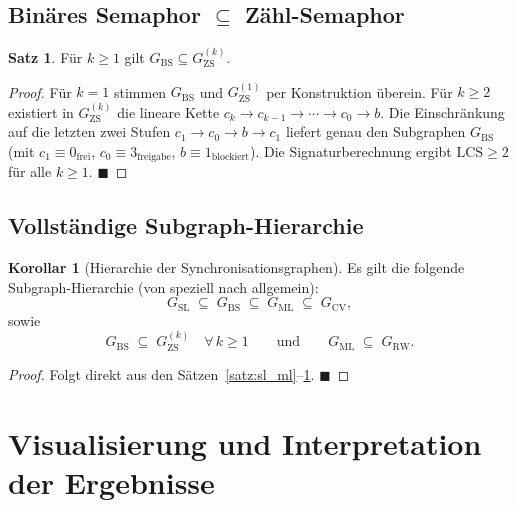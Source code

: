 ﻿\documentclass[a4paper,12pt]{article}
\theoremstyle{definition}
\newtheorem{satz}{Satz}
\newtheorem{korollar}{Korollar}
\begin{document}
\subsection{Binäres Semaphor $\subseteq$ Zähl-Semaphor}

\begin{satz}
  \label{satz:bs_zs}
  Für $k \geq 1$ gilt $G_{\mathrm{BS}} \subseteq G_{\mathrm{ZS}}^{(k)}$.
\end{satz}

\begin{proof}
  Für $k = 1$ stimmen $G_{\mathrm{BS}}$ und $G_{\mathrm{ZS}}^{(1)}$ per
  Konstruktion überein. Für $k \geq 2$ existiert in $G_{\mathrm{ZS}}^{(k)}$
  die lineare Kette $c_k \to c_{k-1} \to \cdots \to c_0 \to b$. Die
  Einschränkung auf die letzten zwei Stufen $c_1 \to c_0 \to b \to c_1$
  liefert genau den Subgraphen $G_{\mathrm{BS}}$ (mit $c_1 \equiv
  0_{\mathrm{frei}}$, $c_0 \equiv 3_{\mathrm{freigabe}}$,
  $b \equiv 1_{\mathrm{blockiert}}$).
  Die Signaturberechnung ergibt $\mathrm{LCS} \geq 2$ für alle $k \geq 1$.
  \hfill$\blacksquare$
\end{proof}

\subsection{Vollständige Subgraph-Hierarchie}

\begin{korollar}[Hierarchie der Synchronisationsgraphen]
  \label{kor:hierarchie}
  Es gilt die folgende Subgraph-Hierarchie (von speziell nach allgemein):
  \[
    G_{\mathrm{SL}} \;\subseteq\; G_{\mathrm{BS}} \;\subseteq\;
    G_{\mathrm{ML}} \;\subseteq\; G_{\mathrm{CV}},
  \]
  sowie
  \[
    G_{\mathrm{BS}} \;\subseteq\; G_{\mathrm{ZS}}^{(k)} \quad \forall\, k \geq 1
    \qquad\text{und}\qquad
    G_{\mathrm{ML}} \;\subseteq\; G_{\mathrm{RW}}.
  \]
\end{korollar}

\begin{proof}
  Folgt direkt aus den Sätzen~\ref{satz:sl_ml}--\ref{satz:bs_zs}.
  \hfill$\blacksquare$
\end{proof}

\section{Visualisierung und Interpretation der Ergebnisse}
\label{sec:plots}
\end{document}
